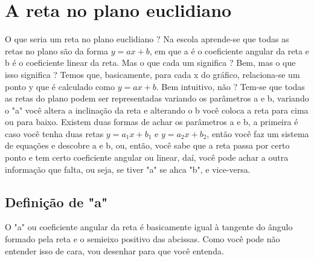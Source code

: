 \documentclass{article}
\begin{document}
\section{A reta no plano euclidiano}

O que seria um reta no plano euclidiano ? Na escola aprende-se que todas as retas no plano são da forma $y = ax + b$, em que a é o coeficiente angular da reta e b é o coeficiente linear da reta. Mas o que cada um significa ? Bem, mas o que isso significa ? Temos que, basicamente, para cada x do gráfico, relaciona-se um ponto y que é calculado como $y = ax +b$. Bem intuitivo, não ? Tem-se que todas as retas do plano podem ser representadas variando os parâmetros a e b, variando o "a" você altera a inclinação da reta e alterando o b você coloca a reta para cima ou para baixo. Existem duas formas de achar os parâmetros a e b, a primeira é caso você tenha duas retas $y = a_1 x + b_1$ e $y = a_2 x + b_2$, então você faz um sistema de equações e descobre a e b, ou, então, você sabe que a reta passa por certo ponto e tem certo coeficiente angular ou linear, daí, você pode achar a outra informação que falta, ou seja, se tiver "a" se ahca "b", e vice-versa.

\subsection{Definição de "a"}
O "a" ou coeficiente angular da reta é basicamente igual à tangente do ângulo formado pela reta e o semieixo positivo das abcissas. Como você pode não entender isso de cara, vou desenhar para que você entenda.
\begin{center}

\end{center}
\end{document}
